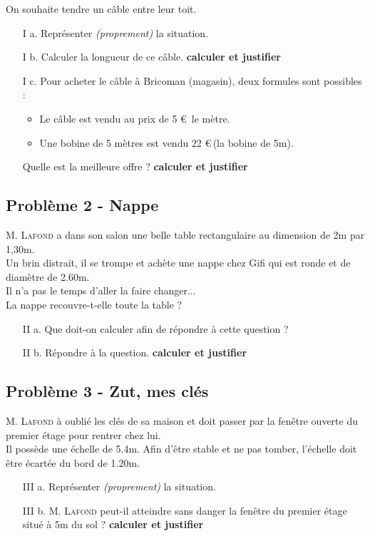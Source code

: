 \documentclass[12pt]{article}
\begin{document}
On souhaite tendre un câble entre leur toit. 

\begin{enumerate}
  \item[I a.] Représenter \textit{(proprement)} la situation.

  \item[I b.] Calculer la longueur de ce câble. \textbf{calculer et justifier}

  \item[I c.] Pour acheter le câble à Bricoman (magasin), deux formules sont possibles :  
  \begin{itemize}
  \item Le câble est vendu  au prix de 5 \euro \, le mètre. 
  \item Une bobine de 5 mètres est vendu 22 \euro \,(la bobine de 5m). 
  \end{itemize} 
  Quelle est la meilleure offre ? \textbf{calculer et justifier}
\end{enumerate}

\subsection*{Problème 2 - Nappe}

\textsc{M. Lafond} a dans son salon une belle table rectangulaire au dimension de 2m par 1,30m. \\
Un brin distrait, il se trompe et achète une nappe chez Gifi qui est ronde et de diamètre de 2.60m. \\
Il n'a pas le temps d'aller la faire changer... \\
La nappe recouvre-t-elle toute la table ?

\begin{enumerate}
  \item[II a.] Que doit-on calculer afin de répondre à cette question ?

  \item[II b.] Répondre à la question. \textbf{calculer et justifier}
\end{enumerate}

\subsection*{Problème 3 - Zut, mes clés}

\textsc{M. Lafond} à oublié les clés de sa maison et doit passer par la fenêtre ouverte du premier étage pour rentrer chez lui. \\
Il possède une échelle de 5.4m. Afin d'être stable et ne pas tomber, l'échelle doit être écartée du bord de 1.20m. 

\begin{enumerate}
\item[III a.] Représenter \textit{(proprement)} la situation.

\item[III b.] \textsc{M. Lafond} peut-il atteindre sans danger la fenêtre du premier étage situé à 5m du sol ?  \textbf{calculer et justifier}
\end{enumerate}
\end{document}

